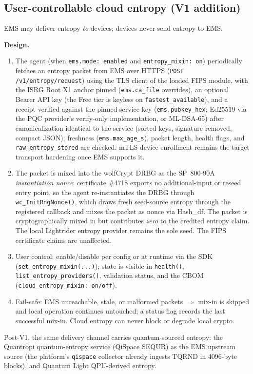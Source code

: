 \documentclass[10pt]{article}
\newcommand{\code}[1]{\texttt{\small #1}}
\begin{document}
\subsection{User-controllable cloud entropy (V1 addition)}\label{sec:cloud-entropy}
EMS may deliver entropy \emph{to} devices; devices never send entropy to EMS.

\textbf{Design.}
\begin{enumerate}
  \item The agent (when \code{ems.mode:\ enabled} and \code{entropy\_mixin:\ on})
        periodically fetches an entropy packet from EMS over HTTPS
        (\code{POST /v1/entropy/request}) using the TLS client of the loaded FIPS module,
        with the ISRG Root X1 anchor pinned (\code{ems.ca\_file} overrides), an optional
        Bearer API key (the Free tier is keyless on \code{fastest\_available}), and a
        receipt verified against the pinned service key (\code{ems.pubkey\_hex};
        Ed25519 via the PQC provider's verify-only implementation, or ML-DSA-65) after
        canonicalization identical to the service (sorted keys, signature removed,
        compact JSON); freshness (\code{ems.max\_age\_s}), packet length, health flags,
        and \code{raw\_entropy\_stored} are checked. mTLS device enrollment remains the
        target transport hardening once EMS supports it.
  \item The packet is mixed into the wolfCrypt DRBG as the SP~800-90A
        \emph{instantiation nonce}: certificate \#4718 exports no additional-input or
        reseed entry point, so the agent re-instantiates the DRBG through
        \code{wc\_InitRngNonce()}, which draws fresh seed-source entropy through the
        registered callback and mixes the packet as nonce via Hash\_df. The packet is
        cryptographically mixed in but contributes \emph{zero} to the credited entropy
        claim. The local Lightrider entropy provider remains the sole seed. The FIPS
        certificate claims are unaffected.
  \item User control: enable/disable per config or at runtime via the SDK
        (\code{set\_entropy\_mixin(...)}); state is visible in \code{health()},
        \code{list\_entropy\_providers()}, validation status, and the CBOM
        (\code{cloud\_entropy\_mixin:\ on/off}).
  \item Fail-safe: EMS unreachable, stale, or malformed packets $\Rightarrow$ mix-in is
        skipped and local operation continues untouched; a status flag records the last
        successful mix-in. Cloud entropy can never block or degrade local crypto.
\end{enumerate}
Post-V1, the same delivery channel carries quantum-sourced entropy: the Quantropi
quantum-entropy service (QiSpace SEQUR) as the EMS upstream source (the platform's
\code{qispace} collector already ingests TQRND in 4096-byte blocks), and Quantum Light
QPU-derived entropy.
\end{document}

